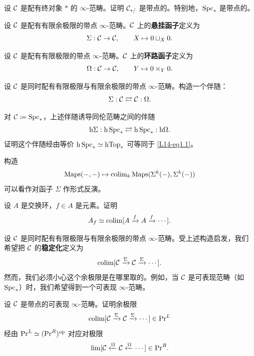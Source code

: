\begin{exercise}\label{L14-2.3}
设 $\mathcal{C}$ 是配有终对象 $\ast$ 的 $\infty$-范畴。证明 $\mathcal{C}_{\ast/}$ 是带点的。特别地，$\operatorname{Spc}_{\ast}$ 是带点的。
\end{exercise}

\begin{definition}\label{L14-2.4}
设 $\mathcal{C}$ 是配有有限余极限的带点 $\infty$-范畴。$\mathcal{C}$ 上的\textbf{悬挂函子}定义为
\[
\Sigma:\mathcal{C}\to\mathcal{C},\qquad X\mapsto 0\sqcup_{X}0.
\]
\end{definition}

\begin{definition}\label{L14-2.5}
设 $\mathcal{C}$ 是配有有限极限的带点 $\infty$-范畴。$\mathcal{C}$ 上的\textbf{环路函子}定义为
\[
\Omega:\mathcal{C}\to\mathcal{C},\qquad Y\mapsto 0\times_{Y}0.
\]
\end{definition}

\begin{exercise}\label{L14-2.6}
设 $\mathcal{C}$ 是同时配有有限极限与有限余极限的带点 $\infty$-范畴。构造一个伴随：
\[
\Sigma:\mathcal{C}\rightleftarrows\mathcal{C}:\Omega.
\]
\end{exercise}

\begin{exercise}\label{L14-2.7}
对 $\mathcal{C}\coloneqq\operatorname{Spc}_{\ast}$，上述伴随诱导同伦范畴之间的伴随
\[
\mathrm{h}\Sigma:\mathrm{h}\operatorname{Spc}_{\ast}\rightleftarrows\mathrm{h}\operatorname{Spc}_{\ast}:\mathrm{h}\Omega.
\]
证明这个伴随经由等价 $\mathrm{h}\operatorname{Spc}_{\ast}\simeq\operatorname{hTop}_{\ast}$ 可等同于 \eqref{L14-eq1.1}。
\end{exercise}

\nitem\label{L14-2.8} 构造
\[
\operatorname{Maps}(-,-)\mapsto\operatorname{colim}_{k}\operatorname{Maps}(\Sigma^{k}(-),\Sigma^{k}(-))
\]
可以看作对函子 $\Sigma$ 作形式反演。

\begin{exercise}\label{L14-2.9}
设 $A$ 是交换环，$f\in A$ 是元素。证明
\[
A_{f}\simeq\operatorname{colim}[A\xrightarrow{f}A\xrightarrow{f}\cdots].
\]
\end{exercise}

\nitem\label{L14-2.10} 设 $\mathcal{C}$ 是同时配有有限极限与有限余极限的带点 $\infty$-范畴。受上述构造启发，我们希望把 $\mathcal{C}$ 的\textbf{稳定化}定义为
\[
\operatorname{colim}[\mathcal{C}\xrightarrow{\Sigma}\mathcal{C}\xrightarrow{\Sigma}\cdots].
\]
然而，我们必须小心这个余极限是在哪里取的。例如，当 $\mathcal{C}$ 是可表现范畴（如 $\operatorname{Spc}_{\ast}$）时，我们希望得到一个可表现 $\infty$-范畴。

\begin{exercise}\label{L14-2.11}
设 $\mathcal{C}$ 是带点的可表现 $\infty$-范畴。证明余极限
\[
\operatorname{colim}[\mathcal{C}\xrightarrow{\Sigma}\mathcal{C}\xrightarrow{\Sigma}\cdots]\in\mathrm{Pr}^{L}
\]
经由 $\mathrm{Pr}^{L}\simeq(\mathrm{Pr}^{R})^{\mathrm{op}}$ 对应对极限
\[
\lim[\mathcal{C}\xleftarrow{\Omega}\mathcal{C}\xleftarrow{\Omega}\cdots]\in\mathrm{Pr}^{R}.
\]
\end{exercise}

